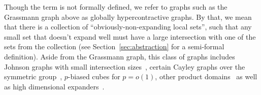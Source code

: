 \documentclass[11pt]{article}
\def \eps {{\varepsilon}}
\theoremstyle{definition}
\begin{document}

Though the term is not formally defined, we refer to graphs such 
as the Grassmann graph above as globally hypercontractive graphs. 
By that, we mean that there is a collection of 
``obviously-non-expanding local sets'', such that any small set that 
doesn't expand well must have a large intersection with one of the sets from 
the collection (see Section~\ref{sec:abstraction} for a semi-formal definition). Aside from the Grassmann graph, this 
class of graphs includes Johnson graphs with small intersection sizes~\cite{KMMS},
certain Cayley graphs over 
the symmetric group~\cite{filmus2020hypercontractivity},
$p$-biased cubes for $p=o(1)$, other product domains~\cite{keevash2021global} as well as high dimensional expanders~\cite{gur2022hypercontractivity,bafna2022hypercontractivity}.
\end{document}
